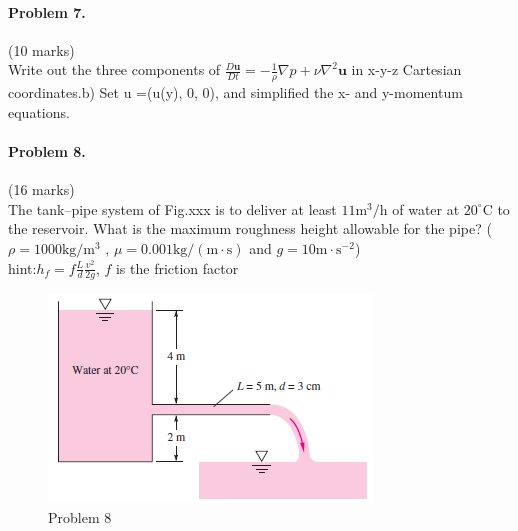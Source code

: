 \documentclass[12pt]{article}
\begin{document}
\paragraph{Problem 7.}\hfill (10 marks)\\
Write out the three components of $\frac{D\textbf{u}}{Dt}=-\frac{1}{\rho}\nabla p+\nu \nabla^2 \textbf{u}$ in x-y-z Cartesian coordinates.b) Set u =(u(y), 0, 0), and simplified the x- and y-momentum equations.\\



\paragraph{Problem 8.}\hfill (16 marks)\\
The tank–pipe system of Fig.xxx is to deliver at least $11\mathrm{m^3/h}$ of water at $20^{\circ}$C to the reservoir. What is the maximum roughness height  allowable for the pipe? ($\rho=1000\mathrm{kg/m^3} \text{ , } \mu=0.001\mathrm{kg/(m\cdot s)}$ and $g=\mathrm{10m\cdot s^{-2}}$)\\
hint:$h_f=f\frac{L}{d}\frac{v^2}{2g}$, $f$ is the friction factor\\ 

\begin{figure}[hb]
	\centering
	\includegraphics[width=0.7\linewidth]{"figs/problem 8"}
	\caption{Problem 8}
	\label{fig:problem-8}
\end{figure}

\end{document}
